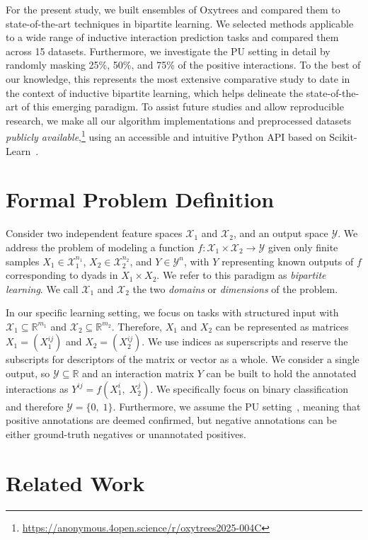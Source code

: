 \documentclass[letterpaper]{article}
\newcommand{\X}{\mathcal{X}}
\newcommand{\Y}{\mathcal{Y}}
\newcommand{\R}{\mathbb{R}}
\begin{document}
For the present study, we built ensembles of Oxytrees and compared them to state-of-the-art techniques in bipartite learning. We selected methods applicable to a wide range of inductive interaction prediction tasks and compared them across 15 datasets.
Furthermore, we investigate the PU setting in detail by randomly masking 25\%, 50\%, and 75\% of the positive interactions.
%
To the best of our knowledge, this represents the most extensive comparative study to date in the context of inductive bipartite learning, which helps delineate the state-of-the-art of this emerging paradigm.
%
To assist future studies and allow reproducible research, we make all our algorithm implementations and preprocessed datasets \emph{publicly available},\footnote{\url{https://anonymous.4open.science/r/oxytrees2025-004C}}
using an accessible and intuitive Python API based on Scikit-Learn~\cite{pedregosa_scikit-learn_2011}.


\section{Formal Problem Definition}
\label{sec:background}


Consider two independent feature spaces $\X_1$ and $\X_2$, and an output space $\Y$.
We address the problem of modeling a function $f \colon \X_1 \times \X_2 \to \Y$ given only finite samples $X_1 \in \X_1^{n_1}$, $X_2 \in \X_2^{n_2}$, and $Y\in \Y^n$, with $Y$ representing known outputs of $f$ corresponding to dyads in $X_1 \times X_2$.
We refer to this paradigm as \emph{bipartite learning}.
We call $\X_1$ and $\X_2$ the two \emph{domains} or \emph{dimensions} of the problem.

In our specific learning setting, we focus on tasks with structured input with $\X_1 \subseteq \R^{m_1}$ and $\X_2 \subseteq \R^{m_2}$. Therefore, $X_1$ and $X_2$ can be represented as matrices $X_1=(X_1^{ij})$ and $X_2=(X_2^{ij})$. We use indices as superscripts and reserve the subscripts for descriptors of the matrix or vector as a whole.
%
We consider a single output, so $\Y \subseteq \R$ and an interaction matrix $Y$ can be built to hold the annotated interactions as $Y^{ij} = f(X_1^i,\; X_2^j)$.
%
We specifically focus on binary classification and therefore $\Y=\{0,\;1\}$. Furthermore, we assume the PU setting~\cite{bekker2020learning}, meaning that positive annotations are deemed confirmed, but negative annotations can be either ground-truth negatives or unannotated positives.


\section{Related Work}
\label{sec:related work}
\end{document}
